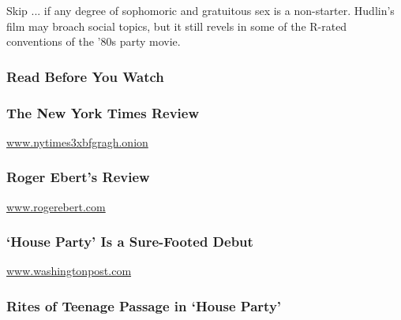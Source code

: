 Skip ... if any degree of sophomoric and gratuitous sex is a
non-starter. Hudlin's film may broach social topics, but it still revels
in some of the R-rated conventions of the '80s party movie.

\hypertarget{read-before-you-watch}{%
\subsubsection{Read Before You Watch}\label{read-before-you-watch}}

\href{http://www.nytimes3xbfgragh.onion/movie/review?res=9C0CE0DF1439F93AA35750C0A966958260}{}

\hypertarget{the-new-york-times-review}{%
\subsubsection{The New York Times
Review}\label{the-new-york-times-review}}

\href{http://www.nytimes3xbfgragh.onion}{www.nytimes3xbfgragh.onion}

\href{https://www.rogerebert.com/reviews/house-party-1990}{}

\hypertarget{roger-eberts-review}{%
\subsubsection{Roger Ebert's Review}\label{roger-eberts-review}}

\href{http://www.rogerebert.com}{www.rogerebert.com}

\href{https://www.washingtonpost.com/wp-srv/style/longterm/movies/videos/housepartyrhinson_a0a915.htm}{}

\hypertarget{house-party-is-a-sure-footed-debut}{%
\subsubsection{`House Party' Is a Sure-Footed
Debut}\label{house-party-is-a-sure-footed-debut}}

\href{http://www.washingtonpost.com}{www.washingtonpost.com}

\href{http://articles.latimes.com/1990-03-09/entertainment/ca-2113_1_house-party}{}

\hypertarget{rites-of-teenage-passage-in-house-party}{%
\subsubsection{Rites of Teenage Passage in `House
Party'}\label{rites-of-teenage-passage-in-house-party}}

